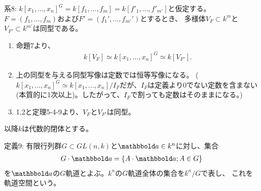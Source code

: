 \begin{framed}
  系8:
  $k[x_1,\dots,x_n]^G = k[f_1,\dots,f_m] = k[f'_1,\dots,f'_{m'}]$と仮定する。
  $F=(f_1,\dots,f_m)$および$F'=(f_1',\dots,f_{m'}')$とするとき、
  多様体$V_F \subset k^m$と$V_{F'}\subset k^{m'}$は同型である。
\end{framed}
\begin{myproof}
  \begin{enumerate}
    \item 命題7より、
    \begin{align}
      k[V_F]\simeq k[x_1,\dots,x_n]^G \simeq k[V_{F'}].
    \end{align}
    \item
    上の同型を与える同型写像は定数では恒等写像になる。
    ($k[x_1,\dots,x_n]^G \simeq k[x_1,\dots,x_n]/I_F$だが、$I_F$は定義より0でない定数を含まない(本質的に1次以上)。したがって、$I_F$で割っても定数はそのままになる。)
    \item
    1,2と定理5-4-9より、$V_F$と$V_{F'}$は同型。
  \end{enumerate}
\end{myproof}

以降$k$は代数的閉体とする。
\begin{framed}
  定義9:
  有限行列群$G\subset GL(n,k)$と$\bbold a \in k^n$に対し、集合
  \begin{align}
    G\cdot \bbold a = \set{A\cdot \bbold a; A \in G}
  \end{align}
  を$\bbold a$の$G$軌道とよぶ。$k^n$の$G$軌道全体の集合を$k^n/G$で表し、
  これを軌道空間という。
\end{framed}

